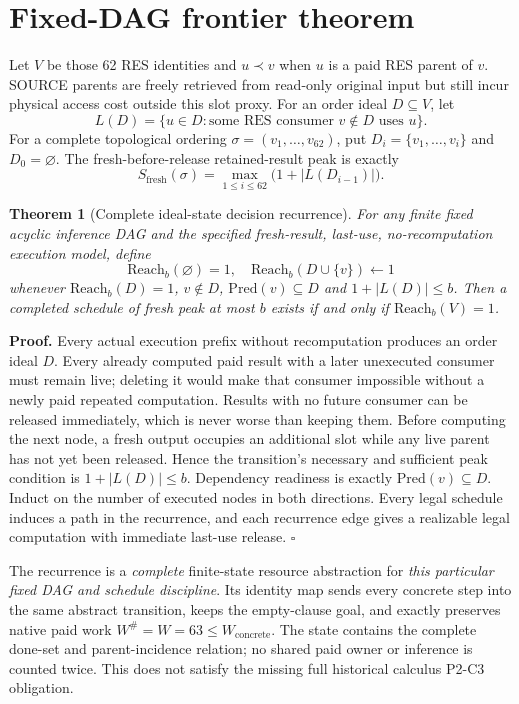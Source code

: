 \documentclass[11pt]{article}
\newtheorem{theorem}{Theorem}
\begin{document}
\section*{Fixed-DAG frontier theorem}
Let $V$ be those 62 RES identities and $u\prec v$ when $u$ is a paid RES parent of $v$. SOURCE parents are freely retrieved from read-only original input but still incur physical access cost outside this slot proxy. For an order ideal $D\subseteq V$, let
\[
L(D)=\{u\in D:\text{some RES consumer }v\notin D\text{ uses }u\}.
\]
For a complete topological ordering $\sigma=(v_1,\ldots,v_{62})$, put $D_i=\{v_1,\ldots,v_i\}$ and $D_0=\varnothing$. The fresh-before-release retained-result peak is exactly
\[
S_{\mathrm{fresh}}(\sigma)=\max_{1\le i\le62}\bigl(1+|L(D_{i-1})|\bigr).
\]
\begin{theorem}[Complete ideal-state decision recurrence]
For any finite fixed acyclic inference DAG and the specified fresh-result, last-use, no-recomputation execution model, define
\[
\mathrm{Reach}_b(\varnothing)=1,\quad
\mathrm{Reach}_b(D\cup\{v\})\gets1
\]
whenever $\mathrm{Reach}_b(D)=1$, $v\notin D$, $\mathrm{Pred}(v)\subseteq D$ and $1+|L(D)|\le b$.
Then a completed schedule of fresh peak at most $b$ exists if and only if $\mathrm{Reach}_b(V)=1$.
\end{theorem}
\textbf{Proof.} Every actual execution prefix without recomputation produces an order ideal $D$. Every already computed paid result with a later unexecuted consumer must remain live; deleting it would make that consumer impossible without a newly paid repeated computation. Results with no future consumer can be released immediately, which is never worse than keeping them. Before computing the next node, a fresh output occupies an additional slot while any live parent has not yet been released. Hence the transition's necessary and sufficient peak condition is $1+|L(D)|\le b$. Dependency readiness is exactly $\mathrm{Pred}(v)\subseteq D$. Induct on the number of executed nodes in both directions. Every legal schedule induces a path in the recurrence, and each recurrence edge gives a realizable legal computation with immediate last-use release. $\square$

The recurrence is a \emph{complete} finite-state resource abstraction for \emph{this particular fixed DAG and schedule discipline}. Its identity map sends every concrete step into the same abstract transition, keeps the empty-clause goal, and exactly preserves native paid work $W^\#=W=63\le W_{\mathrm{concrete}}$. The state contains the complete done-set and parent-incidence relation; no shared paid owner or inference is counted twice. This does not satisfy the missing full historical calculus P2-C3 obligation.
\end{document}
